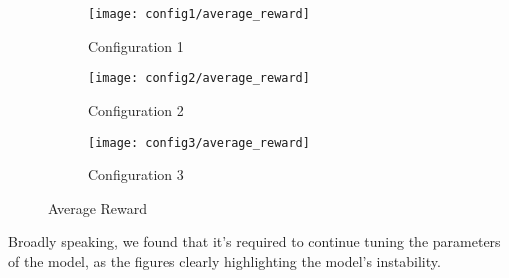 \begin{figure}
\centering
\begin{subfigure}{\textwidth}
  \centering
  \texttt{[image: config1/average\_reward]}
  \caption{Configuration 1}
  \label{fig:sub1}
\end{subfigure}
\begin{subfigure}{\textwidth}
  \centering
  \texttt{[image: config2/average\_reward]}
  \caption{Configuration 2}
  \label{fig:sub2}
\end{subfigure}
\begin{subfigure}{\textwidth}
  \centering
  \texttt{[image: config3/average\_reward]}
  \caption{Configuration 3}
  \label{fig:sub2}
\end{subfigure}
\caption{Average Reward}
\label{fig:average_reward}
\end{figure}


Broadly speaking, we found that it's required to
continue tuning the parameters of the model, as the figures clearly
highlighting the model's instability.
